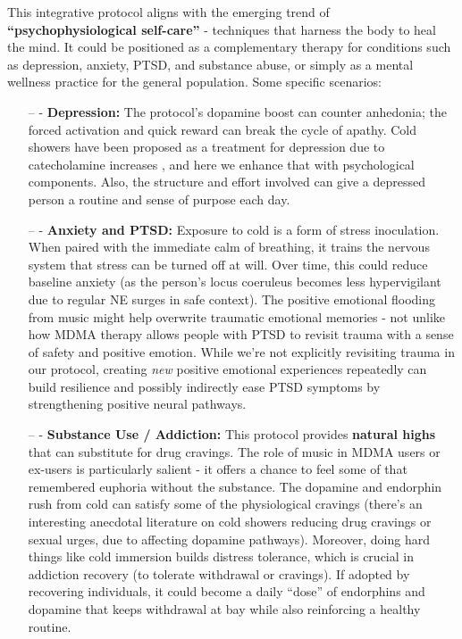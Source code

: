 \documentclass[11pt]{article}
\newcommand{\quotes}[1]{``#1''}
\begin{document}
This integrative protocol aligns with the emerging trend of \textbf{\quotes{psychophysiological self-care}} - techniques that harness the body to heal the mind. It could be positioned as a complementary therapy for conditions such as depression, anxiety, PTSD, and substance abuse, or simply as a mental wellness practice for the general population. Some specific scenarios:
\begin{itemize}
\item[--] - \textbf{Depression:} The protocol's dopamine boost can counter anhedonia; the forced activation and quick reward can break the cycle of apathy. Cold showers have been proposed as a treatment for depression due to catecholamine increases \cite{SHEVCHUK2008995}, and here we enhance that with psychological components. Also, the structure and effort involved can give a depressed person a routine and sense of purpose each day.
\item[--] - \textbf{Anxiety and PTSD:} Exposure to cold is a form of stress inoculation. When paired with the immediate calm of breathing, it trains the nervous system that stress can be turned off at will. Over time, this could reduce baseline anxiety (as the person's locus coeruleus becomes less hypervigilant due to regular NE surges in safe context). The positive emotional flooding from music might help overwrite traumatic emotional memories - not unlike how MDMA therapy allows people with PTSD to revisit trauma with a sense of safety and positive emotion. While we're not explicitly revisiting trauma in our protocol, creating \textit{new} positive emotional experiences repeatedly can build resilience and possibly indirectly ease PTSD symptoms by strengthening positive neural pathways.
\item[--] - \textbf{Substance Use / Addiction:} This protocol provides \textbf{natural highs} that can substitute for drug cravings. The role of music in MDMA users or ex-users is particularly salient - it offers a chance to feel some of that remembered euphoria without the substance. The dopamine and endorphin rush from cold can satisfy some of the physiological cravings (there's an interesting anecdotal literature on cold showers reducing drug cravings or sexual urges, due to affecting dopamine pathways). Moreover, doing hard things like cold immersion builds distress tolerance, which is crucial in addiction recovery (to tolerate withdrawal or cravings). If adopted by recovering individuals, it could become a daily \quotes{dose} of endorphins and dopamine that keeps withdrawal at bay while also reinforcing a healthy routine.

\end{itemize}
\end{document}
